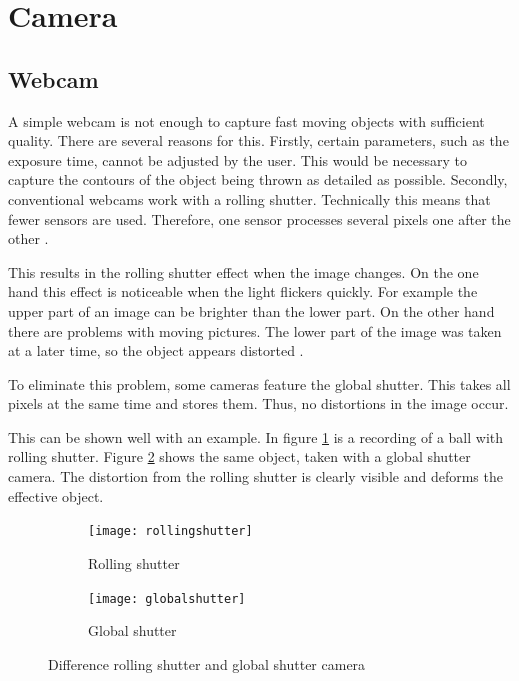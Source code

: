 \section{Camera}
\label{sec:camera}
\subsection{Webcam}
\label{subsec:webcam}
A simple webcam is not enough to capture fast moving objects with sufficient quality. 
There are several reasons for this.
Firstly, certain parameters, such as the exposure time, cannot be adjusted by the user.
This would be necessary to capture the contours of the object being thrown as detailed as possible.
Secondly, conventional webcams work with a rolling shutter.
Technically this means that fewer sensors are used. Therefore, one sensor processes several pixels one after the other \cite{shuttermode}.

This results in the rolling shutter effect when the image changes.
On the one hand this effect is noticeable when the light flickers quickly.
For example the upper part of an image can be brighter than the lower part.
On the other hand there are problems with moving pictures.
The lower part of the image was taken at a later time, so the object appears distorted \cite{global_rolling_shutter}.

To eliminate this problem, some cameras feature the global shutter. 
This takes all pixels at the same time and stores them. 
Thus, no distortions in the image occur.

This can be shown well with an example.
In figure \ref{subfig:rollingshutter} is a recording of a ball with rolling shutter. 
Figure \ref{subfig:globalshutter} shows the same object, taken with a global shutter camera.
The distortion from the rolling shutter is clearly visible and deforms the effective object.

\begin{figure}[ht]
	\centering
	\begin{subfigure}[b]{0.4\textwidth}
		\centering
		\texttt{[image: rollingshutter]}
		\caption{Rolling shutter}
		\label{subfig:rollingshutter}
	\end{subfigure}
	\begin{subfigure}[b]{0.4\textwidth}
		\centering
		\texttt{[image: globalshutter]}
		\caption{Global shutter}
		\label{subfig:globalshutter}
	\end{subfigure}
	\caption{Difference rolling shutter and global shutter camera \cite{shuttermode}}
	\label{fig:shuttermode}
\end{figure}

